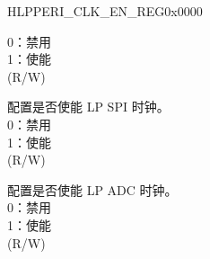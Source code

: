 \begin{register}{H}{LPPERI\_CLK\_EN\_REG}{0x0000}
\begin{regdesc}
\begin{reglist}
0：禁用\\ 1：使能\\(R/W)
\label{fielddesc:LPPERICKENLPSPI}\item [LPPERI\_CK\_EN\_LP\_SPI] 配置是否使能 LP SPI 时钟。\\
0：禁用\\ 1：使能\\(R/W)
\label{fielddesc:LPPERICKENLPADC}\item [LPPERI\_CK\_EN\_LP\_ADC] 配置是否使能 LP ADC 时钟。\\
0：禁用\\ 1：使能\\(R/W)
\item [见下页...]
\end{reglist}\end{regdesc}
\end{register}
 
